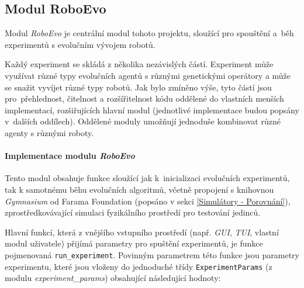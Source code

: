 \subsection{Modul RoboEvo} \label{imp:roboevo}
Modul \emph{RoboEvo} je centrální modul tohoto projektu, sloužící pro spouštění
a~běh experimentů s evolučním vývojem robotů. 

Každý experiment se skládá z několika nezávislých částí. Experiment může
využívat různé typy evolučních agentů s různými genetickými operátory a může se
snažit vyvíjet různé typy robotů. Jak bylo zmíněno výše, tyto částí jsou
pro~přehlednost, čitelnost a rozšířitelnost kódu oddělené do vlastních menších
implementací, rozšiřujících hlavní modul (jednotlivé implementace budou popsány
v~dalších oddílech). Oddělené moduly umožňují jednoduše kombinovat různé agenty
s různými roboty.

\paragraph{Implementace modulu \emph{RoboEvo}}
Tento modul obsahuje funkce sloužící jak k~inicializaci evolučních experimentů,
tak k samotnému běhu evolučních algoritmů, včetně propojení s knihovnou
\emph{Gymnasium} od Farama Foundation (popsáno v sekci \ref{Simulátory -
Porovnání}), zprostředkovávající simulaci fyzikálního prostředí pro testování
jedinců.

Hlavní funkcí, která z vnějšího vstupního prostředí (např. \emph{GUI},
\emph{TUI}, vlastní modul uživatele) přijímá parametry pro spuštění
experimentů, je funkce pojmenovaná \texttt{run\_experiment}. Povinným
parametrem této funkce jsou parametry experimentu, které jsou
vloženy do jednoduché třídy \texttt{ExperimentParams} (z modulu
\emph{experiment\_params}) obsahující následující hodnoty:

